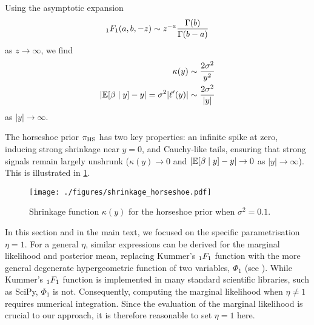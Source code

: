 Using the asymptotic expansion \citep[Chapter 4, Eq. (4.I.3)]{Slater1960}
$$
    {}_1F_1(a,b,-z)\sim z^{-a}\frac{\Gamma(b)}{\Gamma(b-a)}
$$
as $z\to\infty$, we find
\begin{align*}
    \kappa(y)&\sim \frac{2\sigma^2}{y^2}\\
    |\mathbb E[\beta\mid y]-y|=\sigma^2|\ell'(y)|&\sim \frac{2\sigma^2}{|y|}
\end{align*}
as $|y|\to\infty$.

The horseshoe prior $\pi_{\mathrm{HS}}$ has two key properties: an infinite spike at zero, inducing strong shrinkage near $y=0$, and Cauchy-like tails, ensuring that strong signals remain largely unshrunk ($\kappa(y)\to 0$ and $|\mathbb E[\beta\mid y]-y|\to 0$  as $|y|\to\infty$). This is illustrated in \cref{fig:shrinkage_horseshoe}.
\begin{figure}[ht!]
    \centering
    \texttt{[image: ./figures/shrinkage\_horseshoe.pdf]}
    \caption{Shrinkage function $\kappa(y)$ for the horseshoe prior when $\sigma^2=0.1$.}
    \label{fig:shrinkage_horseshoe}
\end{figure}

\begin{remark}[Parameterisation]
In this section and in the main text, we focused on the specific parametrisation $\eta=1$. For a general $\eta$, similar expressions can be derived for the marginal likelihood and posterior mean, replacing Kummer's ${}_1F_1$ function with the more general degenerate hypergeometric function of two variables, $\Phi_1$ (see \citep[Equations (4) in the main text and (A1) in the appendix]{Carvalho2010}). While Kummer's ${}_1F_1$ function is implemented in many standard scientific libraries, such as SciPy, $\Phi_1$ is not. Consequently, computing the marginal likelihood when $\eta\neq 1$ requires numerical integration. Since the evaluation of the marginal likelihood is crucial to our approach, it is therefore reasonable to set $\eta=1$ here.
\end{remark}

